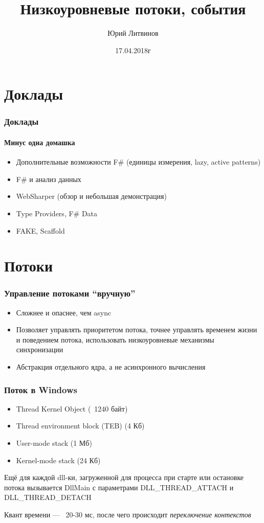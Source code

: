 \documentclass[xetex,mathserif,serif]{beamer}
\title{Низкоуровневые потоки, события}
\author{Юрий Литвинов}
\date{17.04.2018г}
\begin{document}
	\frame{\titlepage}

	\section{Доклады}

	\begin{frame}
		\frametitle{Доклады}
		\framesubtitle{Минус одна домашка}
		\begin{itemize}
			\item Дополнительные возможности F\# (единицы измерения, lazy, active patterns)
			\item F\# и анализ данных
			\item WebSharper (обзор и небольшая демонстрация)
			\item Type Providers, F\# Data
			\item FAKE, Scaffold
		\end{itemize}
	\end{frame}

	\section{Потоки}

	\begin{frame}
		\frametitle{Управление потоками ``вручную''}
		\begin{itemize}
			\item Сложнее и опаснее, чем async
			\item Позволяет управлять приоритетом потока, точнее управлять временем жизни и поведением потока, использовать низкоуровневые механизмы синхронизации
			\item Абстракция отдельного ядра, а не асинхронного вычисления
		\end{itemize}
	\end{frame}

	\begin{frame}
		\frametitle{Поток в Windows}
		\begin{itemize}
			\item Thread Kernel Object (~1240 байт)
			\item Thread environment block (TEB) (4 Кб)
			\item User-mode stack (1 Мб)
			\item Kernel-mode stack (24 Кб)
		\end{itemize}

		Ещё для каждой dll-ки, загруженной для процесса при старте или остановке потока вызывается DllMain с параметрами DLL\_THREAD\_ATTACH и DLL\_THREAD\_DETACH

		\vspace{3mm}
		Квант времени --- ~20-30 мс, после чего происходит \textit{переключение контекстов}
	\end{frame}
\end{document}
